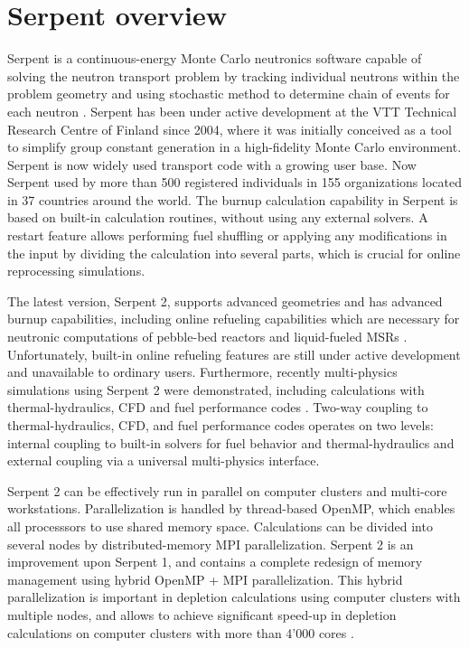 \section{Serpent overview}
Serpent is a continuous-energy Monte Carlo neutronics software capable of 
solving the neutron transport problem by tracking individual neutrons within 
the problem geometry and using stochastic method to determine chain of events 
for each neutron \cite{leppanen_serpent_2014}. Serpent has been under active 
development at the VTT Technical Research Centre of Finland since 2004, where 
it was initially conceived as a tool to simplify group constant generation in 
a high-fidelity Monte Carlo environment. Serpent is now widely used transport 
code  with a growing user base. Now Serpent used by more than 500 registered 
individuals in 155 organizations located in 37 countries around the world. The 
burnup calculation capability in Serpent is based on built-in calculation 
routines, without using any external solvers. A restart feature allows 
performing fuel shuffling or applying any modifications in the input by 
dividing the calculation into several parts, which is crucial for online 
reprocessing simulations.

The latest version, Serpent 2, supports advanced geometries and has advanced 
burnup capabilities, including online refueling capabilities which are 
necessary for neutronic computations of pebble-bed reactors and liquid-fueled 
\glspl{MSR} \cite{aufiero_extended_2013}. Unfortunately, built-in online 
refueling features are still under active development and unavailable to 
ordinary users. Furthermore, recently multi-physics simulations using Serpent  
2 were demonstrated, including  calculations with thermal-hydraulics, 
\gls{CFD} and fuel performance codes \cite{leppanen_numerical_2015}. Two-way 
coupling to thermal-hydraulics, \gls{CFD}, and fuel performance codes operates 
on two levels: internal coupling to built-in solvers for fuel behavior and 
thermal-hydraulics and external coupling via a universal multi-physics 
interface. 

Serpent 2 can be effectively run in parallel on computer clusters and 
multi-core workstations. Parallelization is handled by thread-based OpenMP, 
which enables all processsors to use shared memory space. Calculations can be 
divided into several nodes by distributed-memory \gls{MPI} parallelization. 
Serpent 2  is an improvement upon Serpent 1, and contains a complete redesign 
of memory management using hybrid OpenMP \cite{dagum_openmp_1998} + \gls{MPI} 
parallelization.  This hybrid parallelization is important in depletion 
calculations using computer clusters with multiple nodes, and allows to 
achieve significant speed-up in depletion calculations on computer clusters 
with more than 4'000 cores \cite{leppanen_serpent_2014}. 

